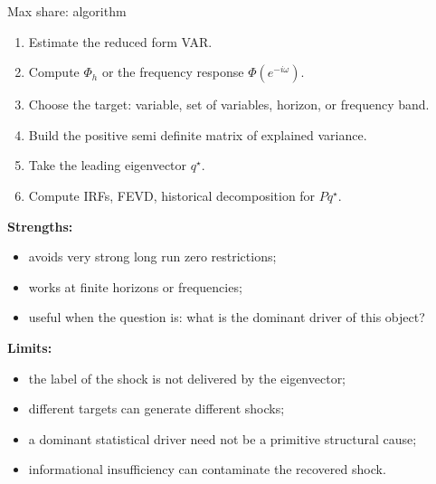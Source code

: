\documentclass{beamer}
\begin{document}
\begin{frame}{Max share: algorithm}
\footnotesize

\begin{enumerate}
  \item Estimate the reduced form VAR.
  \item Compute $\Phi_h$ or the frequency response $\Phi(e^{-i\omega})$.
  \item Choose the target: variable, set of variables, horizon, or frequency band.
  \item Build the positive semi definite matrix of explained variance.
  \item Take the leading eigenvector $q^\star$.
  \item Compute IRFs, FEVD, historical decomposition for $Pq^\star$.
\end{enumerate}


\textbf{Strengths:}
\begin{itemize}
  \item avoids very strong long run zero restrictions;
  \item works at finite horizons or frequencies;
  \item useful when the question is: what is the dominant driver of this object?
\end{itemize}

\textbf{Limits:}
\begin{itemize}
  \item the label of the shock is not delivered by the eigenvector;
  \item different targets can generate different shocks;
  \item a dominant statistical driver need not be a primitive structural cause;
  \item informational insufficiency can contaminate the recovered shock.
\end{itemize}


\end{frame}
\end{document}

